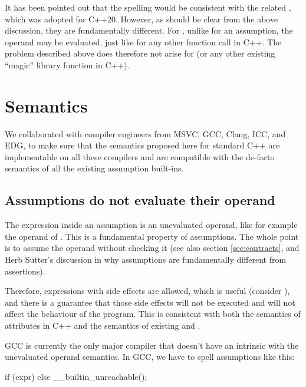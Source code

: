 It has been pointed out that the spelling  would be consistent with the related , which was adopted for C++20. However, as should be clear from the above discussion, they are fundamentally different. For ,  unlike for an assumption, the operand may be evaluated, just like for any other function call in C++. The problem described above does therefore not arise for  (or any other existing ``magic'' library function in C++).



\section{Semantics}
\label{sec:semantics}

We collaborated with compiler engineers from MSVC, GCC, Clang, ICC, and EDG, to make sure that the semantics proposed here for standard C++ are implementable on all these compilers and are compatible with the de-facto semantics of all the existing assumption built-ins.

\subsection{Assumptions do not evaluate their operand}

The expression inside an assumption is an unevaluated operand, like for example the operand of . This is a fundamental property of assumptions. The whole point is to assume the operand without checking it (see also section \ref{sec:contracts}, and Herb Sutter's discussion in \cite{P2064R0} why assumptions are fundamentally different from assertions).

Therefore, expressions with side effects are allowed, which is useful (consider \tcode{[[assume(++ptr != end)]]}), and there is a guarantee that those side effects will not be executed and will not affect the behaviour of the program. This is consistent with both the semantics of attributes in C++ and the semantics of existing  and .

GCC is currently the only major compiler that doesn't have an intrinsic with the unevaluated operand semantics. In GCC, we have to spell assumptions like this:

\begin{codeblock}
if (expr) {} else { __builtin_unreachable(); }
\end{codeblock}

